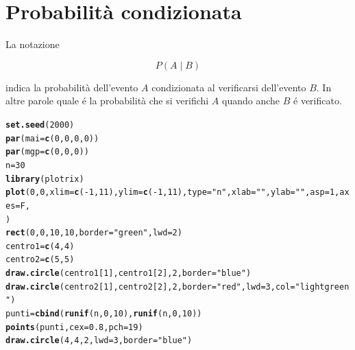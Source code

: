 \documentclass[onecolumn,12pt]{book}\usepackage[]{graphicx}\usepackage[]{color}
\makeatletter
\newcommand{\hlnum}[1]{\textcolor[rgb]{0.686,0.059,0.569}{#1}}%
\newcommand{\hlstr}[1]{\textcolor[rgb]{0.192,0.494,0.8}{#1}}%
\newcommand{\hlopt}[1]{\textcolor[rgb]{0,0,0}{#1}}%
\newcommand{\hlstd}[1]{\textcolor[rgb]{0.345,0.345,0.345}{#1}}%
\newcommand{\hlkwb}[1]{\textcolor[rgb]{0.69,0.353,0.396}{#1}}%
\newcommand{\hlkwc}[1]{\textcolor[rgb]{0.333,0.667,0.333}{#1}}%
\newcommand{\hlkwd}[1]{\textcolor[rgb]{0.737,0.353,0.396}{\textbf{#1}}}%
\newenvironment{kframe}{%
 \def\at@end@of@kframe{}%
 \ifinner\ifhmode%
  \def\at@end@of@kframe{\end{minipage}}%
  \begin{minipage}{\columnwidth}%
 \fi\fi%
 \def\FrameCommand##1{\hskip\@totalleftmargin \hskip-\fboxsep
 \colorbox{shadecolor}{##1}\hskip-\fboxsep
     \hskip-\linewidth \hskip-\@totalleftmargin \hskip\columnwidth}%
 \MakeFramed {\advance\hsize-\width
   \@totalleftmargin\z@ \linewidth\hsize
   \@setminipage}}%
 {\par\unskip\endMakeFramed%
 \at@end@of@kframe}
\newenvironment{knitrout}{}{} %
\makeatother
\begin{document}
 
\section{Probabilità condizionata}

La notazione 

$$P(A\mid B)$$

indica la probabilità  dell'evento $A$ condizionata al verificarsi dell'evento $B$.
In altre parole quale é la probabilità che si verifichi $A$ quando anche $B$ é verificato. 
\begin{knitrout}
\color{fgcolor}\begin{kframe}
\begin{alltt}
\hlkwd{set.seed}\hlstd{(}\hlnum{2000}\hlstd{)}
\hlkwd{par}\hlstd{(}\hlkwc{mai}\hlstd{=}\hlkwd{c}\hlstd{(}\hlnum{0}\hlstd{,}\hlnum{0}\hlstd{,}\hlnum{0}\hlstd{,}\hlnum{0}\hlstd{))}
\hlkwd{par}\hlstd{(}\hlkwc{mgp}\hlstd{=}\hlkwd{c}\hlstd{(}\hlnum{0}\hlstd{,}\hlnum{0}\hlstd{,}\hlnum{0}\hlstd{))}
\hlstd{n}\hlkwb{=}\hlnum{30}
\hlkwd{library}\hlstd{(plotrix)}
\hlkwd{plot}\hlstd{(}\hlnum{0}\hlstd{,}\hlnum{0}\hlstd{,}\hlkwc{xlim}\hlstd{=}\hlkwd{c}\hlstd{(}\hlopt{-}\hlnum{1}\hlstd{,}\hlnum{11}\hlstd{),}\hlkwc{ylim}\hlstd{=}\hlkwd{c}\hlstd{(}\hlopt{-}\hlnum{1}\hlstd{,}\hlnum{11}\hlstd{),}\hlkwc{type}\hlstd{=}\hlstr{"n"}\hlstd{,}\hlkwc{xlab}\hlstd{=}\hlstr{""}\hlstd{,}\hlkwc{ylab}\hlstd{=}\hlstr{""}\hlstd{,}\hlkwc{asp}\hlstd{=}\hlnum{1}\hlstd{,}\hlkwc{axes}\hlstd{=F,}
     \hlstd{)}
\hlkwd{rect}\hlstd{(}\hlnum{0}\hlstd{,}\hlnum{0}\hlstd{,}\hlnum{10}\hlstd{,}\hlnum{10}\hlstd{,}\hlkwc{border}\hlstd{=}\hlstr{"green"}\hlstd{,}\hlkwc{lwd}\hlstd{=}\hlnum{2}\hlstd{)}
\hlstd{centro1}\hlkwb{=}\hlkwd{c}\hlstd{(}\hlnum{4}\hlstd{,}\hlnum{4}\hlstd{)}
\hlstd{centro2}\hlkwb{=}\hlkwd{c}\hlstd{(}\hlnum{5}\hlstd{,}\hlnum{5}\hlstd{)}
\hlkwd{draw.circle}\hlstd{(centro1[}\hlnum{1}\hlstd{],centro1[}\hlnum{2}\hlstd{],}\hlnum{2}\hlstd{,}\hlkwc{border}\hlstd{=}\hlstr{"blue"}\hlstd{)}
\hlkwd{draw.circle}\hlstd{(centro2[}\hlnum{1}\hlstd{],centro2[}\hlnum{2}\hlstd{],}\hlnum{2}\hlstd{,}\hlkwc{border}\hlstd{=}\hlstr{"red"}\hlstd{,}\hlkwc{lwd}\hlstd{=}\hlnum{3}\hlstd{,}\hlkwc{col}\hlstd{=}\hlstr{"light green"}\hlstd{)}
\hlstd{punti}\hlkwb{=}\hlkwd{cbind}\hlstd{(}\hlkwd{runif}\hlstd{(n,}\hlnum{0}\hlstd{,}\hlnum{10}\hlstd{),}\hlkwd{runif}\hlstd{(n,}\hlnum{0}\hlstd{,}\hlnum{10}\hlstd{))}
\hlkwd{points}\hlstd{(punti,}\hlkwc{cex}\hlstd{=}\hlnum{0.8}\hlstd{,}\hlkwc{pch}\hlstd{=}\hlnum{19}\hlstd{)}
\hlkwd{draw.circle}\hlstd{(}\hlnum{4}\hlstd{,}\hlnum{4}\hlstd{,}\hlnum{2}\hlstd{,}\hlkwc{lwd}\hlstd{=}\hlnum{3}\hlstd{,}\hlkwc{border}\hlstd{=}\hlstr{"blue"}\hlstd{)}

\end{alltt}
\end{kframe}
\end{knitrout}
\end{document}
